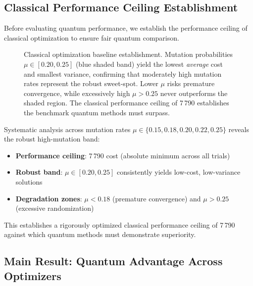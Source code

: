 \subsection{Classical Performance Ceiling Establishment}

Before evaluating quantum performance, we establish the performance ceiling of classical optimization to ensure fair quantum comparison.


\begin{figure}[htb]
    \centering
    \caption{Classical optimization baseline establishment. Mutation probabilities $\mu \in [0.20, 0.25]$ (blue shaded band) yield the lowest \emph{average} cost and smallest variance, confirming that moderately high mutation rates represent the robust sweet-spot. Lower $\mu$ risks premature convergence, while excessively high $\mu > 0.25$ never outperforms the shaded region. The classical performance ceiling of 7\,790 establishes the benchmark quantum methods must surpass.}
    \label{fig:ga_mutation}
\end{figure}

Systematic analysis across mutation rates $\mu \in \{0.15, 0.18, 0.20, 0.22, 0.25\}$ reveals the robust high-mutation band:
\begin{itemize}[nosep]
    \item \textbf{Performance ceiling}: 7\,790 cost (absolute minimum across all trials)
    \item \textbf{Robust band}: $\mu \in [0.20, 0.25]$ consistently yields low-cost, low-variance solutions  
    \item \textbf{Degradation zones}: $\mu < 0.18$ (premature convergence) and $\mu > 0.25$ (excessive randomization)
\end{itemize}

This establishes a rigorously optimized classical performance ceiling of 7\,790 against which quantum methods must demonstrate superiority.

\subsection{Main Result: Quantum Advantage Across Optimizers}

